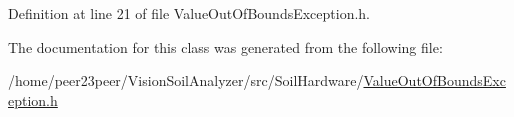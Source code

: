 Definition at line 21 of file Value\+Out\+Of\+Bounds\+Exception.\+h.



The documentation for this class was generated from the following file\+:\begin{DoxyCompactItemize}
\item 
/home/peer23peer/\+Vision\+Soil\+Analyzer/src/\+Soil\+Hardware/\hyperlink{_value_out_of_bounds_exception_8h}{Value\+Out\+Of\+Bounds\+Exception.\+h}\end{DoxyCompactItemize}

